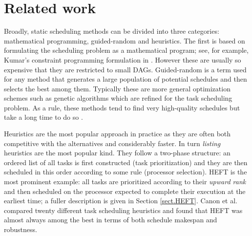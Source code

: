 \documentclass[runningheads]{llncs}
\begin{document}
\section{Related work}
\label{sect.lit_review}

Broadly, static scheduling methods can be divided into three categories: mathematical programming, guided-random and heuristics. The first is based on formulating the scheduling problem as a mathematical program; see, for example, Kumar's constraint programming formulation in \cite{kumar:tel-01538516}. However these are usually so expensive that they are restricted to small DAGs. Guided-random is a term used for any method that generates a large population of potential schedules and then selects the best among them. Typically these are more general optimization schemes such as genetic algorithms which are refined for the task scheduling problem. As a rule, these methods tend to find very high-quality schedules but take a long time to do so \cite{BRAUN2001810}. 

Heuristics are the most popular approach in practice as they are often both competitive with the alternatives and considerably faster. In turn {\em listing} heuristics are the most popular kind. They follow a two-phase structure: an ordered list of all tasks is first constructed (task prioritization) and they are then scheduled in this order according to some rule (processor selection). HEFT is the most prominent example: all tasks are prioritized according to their {\em upward rank} and then scheduled on the processor expected to complete their execution at the earliest time; a fuller description is given in Section \ref{sect.HEFT}. Canon et al. \cite{canon2008comparative} compared twenty different task scheduling heuristics and found that HEFT was almost always among the best in terms of both schedule makespan and robustness.

\end{document}
